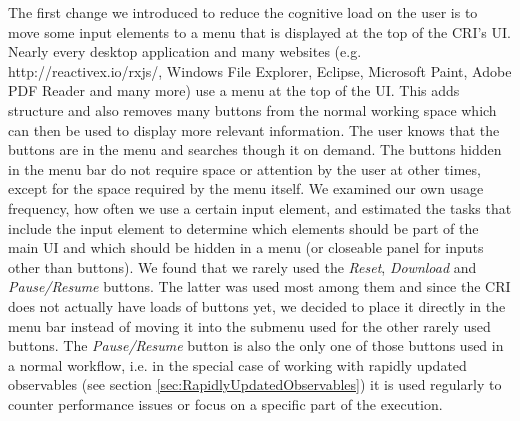 The first change we introduced to reduce the cognitive load on the user is to move some input elements to a menu that is displayed at the top of the CRI's UI. Nearly every desktop application and many websites (e.g. http://reactivex.io/rxjs/, Windows File Explorer, Eclipse, Microsoft Paint, Adobe PDF Reader and many more) use a menu at the top of the UI. This adds structure and also removes many buttons from the normal working space which can then be used to display more relevant information. The user knows that the buttons are in the menu and searches though it on demand. The buttons hidden in the menu bar do not require space or attention by the user at other times, except for the space required by the menu itself. We examined our own usage frequency, how often we use a certain input element, and estimated the tasks that include the input element to determine which elements should be part of the main UI and which should be hidden in a menu (or closeable panel for inputs other than buttons). We found that we rarely used the \emph{Reset}, \emph{Download} and \emph{Pause/Resume} buttons. The latter was used most among them and since the CRI does not actually have loads of buttons yet, we decided to place it directly in the menu bar instead of moving it into the submenu used for the other rarely used buttons. The \emph{Pause/Resume} button is also the only one of those buttons used in a normal workflow, i.e. in the special case of working with rapidly updated observables (see section \ref{sec:RapidlyUpdatedObservables}) it is used regularly to counter performance issues or focus on a specific part of the execution.
